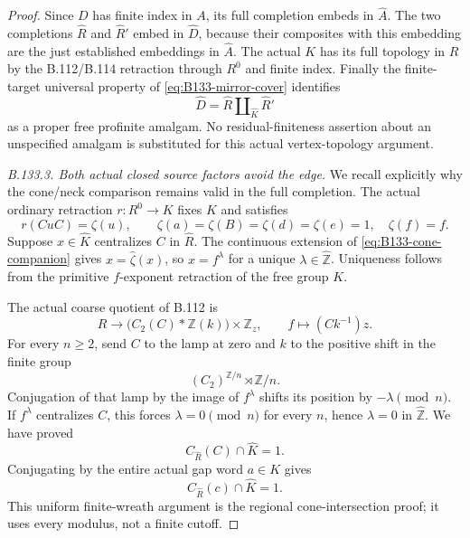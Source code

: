 \begin{proof}
Since $D$ has finite index in $A$, its full completion embeds
in $\widehat A$. The two completions $\widehat R$ and
$\widehat R'$ embed in $\widehat D$, because their composites
with this embedding are the just established embeddings in
$\widehat A$. The actual $K$ has its full topology in $R$ by
the B.112/B.114 retraction through $R^0$ and finite index.
Finally the finite-target universal property of
\eqref{eq:B133-mirror-cover} identifies
\begin{equation}\label{eq:B133-proper-completed-cover}
 \widehat D=\widehat R\amalg_{\widehat K}\widehat R'
\end{equation}
as a proper free profinite amalgam. No residual-finiteness
assertion about an unspecified amalgam is substituted for this
actual vertex-topology argument.

\emph{B.133.3. Both actual closed source factors avoid the edge.}
We recall explicitly why the cone/neck comparison remains valid
in the full completion. The actual ordinary retraction
$r:R^0\to K$ fixes $K$ and satisfies
\begin{equation}\label{eq:B133-cone-companion}
 r(CuC)=\zeta(u),\qquad
 \zeta(a)=\zeta(B)=\zeta(d)=\zeta(e)=1,
 \quad\zeta(f)=f.
\end{equation}
Suppose $x\in\widehat K$ centralizes $C$ in $\widehat R$.
The continuous extension of \eqref{eq:B133-cone-companion}
gives $x=\widehat\zeta(x)$, so $x=f^\lambda$ for a unique
$\lambda\in\widehat{\mathbb Z}$. Uniqueness follows from the
primitive $f$-exponent retraction of the free group $K$.

The actual coarse quotient of B.112 is
\[
 R\longrightarrow
   \bigl(C_2(C)*\mathbb Z(k)\bigr)\times\mathbb Z_z,
 \qquad f\longmapsto(Ck^{-1})z.
\]
For every $n\geq2$, send $C$ to the lamp at zero and $k$ to
the positive shift in the finite group
\[
 (C_2)^{\mathbb Z/n}\rtimes\mathbb Z/n.
\]
Conjugation of that lamp by the image of $f^\lambda$ shifts its
position by $-\lambda\pmod n$. If $f^\lambda$ centralizes $C$,
this forces $\lambda=0\pmod n$ for every $n$, hence
$\lambda=0$ in $\widehat{\mathbb Z}$. We have proved
\[
 C_{\widehat R}(C)\cap\widehat K=1.
\]
Conjugating by the entire actual gap word $a\in K$ gives
\begin{equation}\label{eq:B133-compact-cone-avoidance}
 C_{\widehat R}(c)\cap\widehat K=1.
\end{equation}
This uniform finite-wreath argument is the regional
cone-intersection proof; it uses every modulus, not a finite cutoff.


\end{proof}
